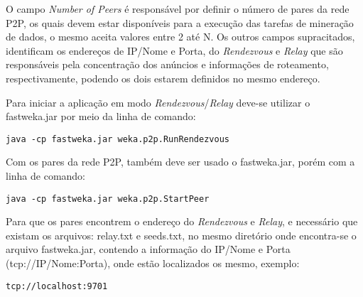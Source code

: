 O campo \textit{Number of Peers} é responsável por definir o número de pares da rede P2P, os quais devem estar disponíveis para a execução das tarefas de mineração de dados, o mesmo aceita valores entre 2 até N.  Os outros campos supracitados, identificam os endereços de IP/Nome e Porta, do \textit{Rendezvous} e \textit{Relay} que são responsáveis pela concentração dos anúncios e informações de roteamento, respectivamente, podendo os dois estarem definidos no mesmo endereço.

Para iniciar a aplicação em modo \textit{Rendezvous}/\textit{Relay} deve-se utilizar o fastweka.jar por meio da linha de comando:
\begin{Verbatim}[frame=single]
java -cp fastweka.jar weka.p2p.RunRendezvous
\end{Verbatim}

Com os pares da rede P2P, também deve ser usado o fastweka.jar, porém com a linha de comando:
\begin{Verbatim}[frame=single]
java -cp fastweka.jar weka.p2p.StartPeer
\end{Verbatim}

Para que os pares encontrem o endereço do \textit{Rendezvous} e \textit{Relay}, e necessário que existam os arquivos: relay.txt e seeds.txt, no mesmo diretório onde encontra-se o arquivo fastweka.jar, contendo a informação do IP/Nome e Porta (tcp://IP/Nome:Porta), onde estão localizados os mesmo, exemplo:
\begin{Verbatim}[frame=single]
tcp://localhost:9701
\end{Verbatim}

